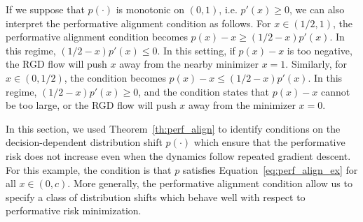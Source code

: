If we suppose that $p(\cdot)$ is monotonic on $(0,1)$, i.e. $p'(x) \ge 0$, we can also interpret the performative alignment condition as follows. For $x \in (1/2,1)$, the performative alignment condition becomes $p(x) - x \ge (1/2 - x)p'(x)$. In this regime, $(1/2 - x)p'(x) \le 0$. In this setting, if $p(x) - x$ is too negative, the RGD flow will push $x$ away from the nearby minimizer $x = 1$. Similarly, for $x \in (0,1/2)$, the condition becomes $p(x) - x \le (1/2 - x)p'(x)$. In this regime, $(1/2 - x)p'(x) \ge 0$, and the condition states that $p(x) - x$ cannot be too large, or the RGD flow will push $x$ away from the minimizer $x = 0$.

In this section, we used Theorem~\ref{th:perf_align} to identify conditions on the decision-dependent distribution shift $p(\cdot)$ which ensure that the performative risk does not increase even when the dynamics follow repeated gradient descent.
For this example, the condition is that $p$ satisfies Equation~\eqref{eq:perf_align_ex} for all $x \in (0,c)$. 
More generally, the performative alignment condition allow us to specify a class of distribution shifts which behave well with respect to performative risk minimization.

